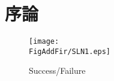\chapter{序論}
\newcommand{\FigAddFir}{./src/Chapter1/graph/eps}



\begin{figure}
\centering
\texttt{[image: \\FigAddFir/SLN1.eps]}
\caption{Success/Failure}
\label{fig:世界のロケット打ち上げ数}
\end{figure}
